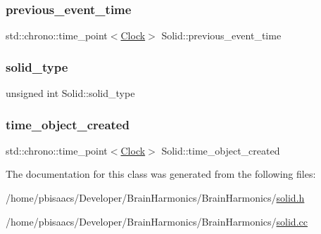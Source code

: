 \subsubsection{\texorpdfstring{previous\+\_\+event\+\_\+time}{previous\_event\_time}}
{\footnotesize\ttfamily std\+::chrono\+::time\+\_\+point$<$\mbox{\hyperlink{universe_8h_a0ef8d951d1ca5ab3cfaf7ab4c7a6fd80}{Clock}}$>$ Solid\+::previous\+\_\+event\+\_\+time\hspace{0.3cm}{\ttfamily [private]}}

\mbox{\label{classSolid_a4cb0429a28598d5501553787524b705d}} 
\subsubsection{\texorpdfstring{solid\+\_\+type}{solid\_type}}
{\footnotesize\ttfamily unsigned int Solid\+::solid\+\_\+type\hspace{0.3cm}{\ttfamily [private]}}

\mbox{\label{classSolid_ab511520c2e523c203c1ca7b97f573f65}} 
\subsubsection{\texorpdfstring{time\+\_\+object\+\_\+created}{time\_object\_created}}
{\footnotesize\ttfamily std\+::chrono\+::time\+\_\+point$<$\mbox{\hyperlink{universe_8h_a0ef8d951d1ca5ab3cfaf7ab4c7a6fd80}{Clock}}$>$ Solid\+::time\+\_\+object\+\_\+created\hspace{0.3cm}{\ttfamily [private]}}



The documentation for this class was generated from the following files\+:\begin{DoxyCompactItemize}
\item 
/home/pbisaacs/\+Developer/\+Brain\+Harmonics/\+Brain\+Harmonics/\mbox{\hyperlink{solid_8h}{solid.\+h}}\item 
/home/pbisaacs/\+Developer/\+Brain\+Harmonics/\+Brain\+Harmonics/\mbox{\hyperlink{solid_8cc}{solid.\+cc}}\end{DoxyCompactItemize}

